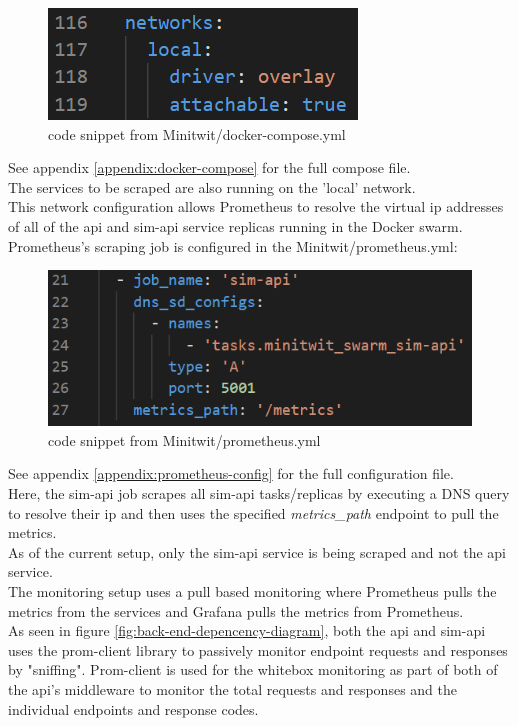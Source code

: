 \begin{figure}[H]
    \centering
    \includegraphics[width=0.4\linewidth]{report/images/LocalNetwork1.png}
    \caption{code snippet from Minitwit/docker-compose.yml}
    \label{fig:docker-compose-overlay}
\end{figure}
\noindent See appendix \ref{appendix:docker-compose} for the full compose file.\\
The services to be scraped are also running on the 'local' network.\\
This network configuration allows Prometheus to resolve the virtual ip addresses of all of the api and sim-api service replicas running in the Docker swarm. Prometheus's scraping job is configured in the Minitwit/prometheus.yml:

\begin{figure}[H]
    \centering
    \includegraphics[width=0.66\linewidth]{report/images/LocalNetwork2.png}
    \caption{code snippet from Minitwit/prometheus.yml}
    \label{fig:prometheus-scraping}
\end{figure}
\noindent See appendix \ref{appendix:prometheus-config} for the full configuration file.\\
Here, the sim-api job scrapes all sim-api tasks/replicas by executing a DNS query to resolve their ip and then uses the specified \textit{metrics\_path} endpoint to pull the metrics.\\
As of the current setup, only the sim-api service is being scraped and not the api service.\\
The monitoring setup uses a pull based monitoring where Prometheus pulls the metrics from the services and Grafana pulls the metrics from Prometheus.\\

As seen in figure \ref{fig:back-end-depencency-diagram}, both the api and sim-api uses the prom-client library to passively monitor endpoint requests and responses by "sniffing".
Prom-client is used for the whitebox monitoring as part of both of the api's middleware to monitor the total requests and responses and the individual endpoints and response codes.

